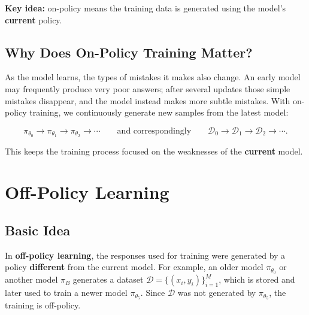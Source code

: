 \documentclass[11pt]{article}
\begin{document}
\begin{plainbox}
\textbf{Key idea:} on-policy means the training data is generated using the model's \textbf{current} policy.
\end{plainbox}

\subsection*{Why Does On-Policy Training Matter?}

As the model learns, the types of mistakes it makes also change. An early model may frequently produce very poor answers; after several updates those simple mistakes disappear, and the model instead makes more subtle mistakes. With on-policy training, we continuously generate new samples from the latest model:

\[
\pi_{\theta_0} \rightarrow \pi_{\theta_1} \rightarrow \pi_{\theta_2} \rightarrow \cdots
\qquad\text{and correspondingly}\qquad
\mathcal{D}_0 \rightarrow \mathcal{D}_1 \rightarrow \mathcal{D}_2 \rightarrow \cdots.
\]

This keeps the training process focused on the weaknesses of the \textbf{current} model.

\section*{Off-Policy Learning}

\subsection*{Basic Idea}

In \textbf{off-policy learning}, the responses used for training were generated by a policy \textbf{different} from the current model. For example, an older model $\pi_{\theta_0}$ or another model $\pi_B$ generates a dataset $\mathcal{D} = \{(x_i,y_i)\}_{i=1}^{M}$, which is stored and later used to train a newer model $\pi_{\theta_5}$. Since $\mathcal{D}$ was not generated by $\pi_{\theta_5}$, the training is off-policy.

\begin{center}
\end{center}
\end{document}
